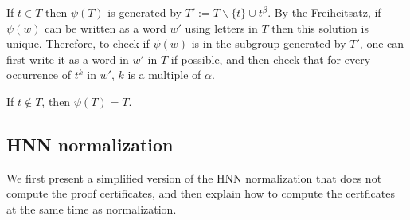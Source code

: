 \documentclass[11pt]{article} %
\theoremstyle{definition}
\theoremstyle{definition}
\theoremstyle{definition}
\theoremstyle{definition}
\theoremstyle{definition}
\newtheorem{defn}[theorem]{Definition}
\theoremstyle{definition}
\begin{document}
If $t \in T$ then $\psi(T)$ is generated by
$T' := T \backslash \{t\} \cup t^\beta$. By the Freiheitsatz, if $\psi(w)$ can be written
as a word $w'$ using letters in $T$ then this solution is unique. Therefore,
to check if $\psi(w)$ is in the subgroup generated by $T'$, one can first
write it as a word in $w'$ in $T$ if possible, and then check that for every
occurrence of $t^k$ in $w'$, $k$ is a multiple of $\alpha$.

If $t \notin T$, then  $\psi(T) = T$.







\subsection{HNN normalization}\label{HNNnorm}

We first present a simplified version of the HNN normalization that does not compute
the proof certificates, and then explain how to compute the certficates at the
same time as normalization.
\end{document}

